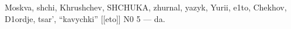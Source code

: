 \documentclass{article}
\begin{document}
{\selectfont Moskva, shchi, Khrushchev, SHCHUKA, zhurnal, yazyk, Yurii, e1to, Chekhov, D1ordje,
tsar', ``kavychki'' [[eto]] N0 5 --- da.}
\end{document}
